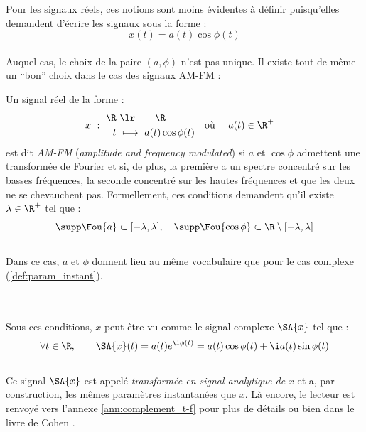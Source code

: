 Pour les signaux réels, ces notions sont moins évidentes à définir puisqu'elles demandent d'écrire les signaux sous la forme :
\[x(t) = a(t) \cos\phi(t)\]
\\
Auquel cas, le choix de la paire $(a,\phi)$ n'est pas unique. Il existe tout de même un ``bon'' choix dans le cas des signaux AM-FM :
\begin{definition}[Signal AM-FM]
	Un signal réel de la forme :
	\begin{align}
		x\ &:\ \begin{aligned}\R\ &\lr\qquad \R \\
			t\ &\longmapsto\ a(t) \cos\phi(t)
		\end{aligned}  &  \text{où }\quad a(t)\in\R^+\quad
	\end{align}
	est dit \emph{AM-FM} (\emph{amplitude and frequency modulated}) si $a$ et $\cos\phi$ admettent une transformée de Fourier et si, de plus, la première a un spectre concentré sur les basses fréquences, la seconde concentré sur les hautes fréquences et que les deux ne se chevauchent pas.
	Formellement, ces conditions demandent qu'il existe $\lambda\in\R^+$ tel que :
	\begin{equation}\label{eq:condi_AM-FM}
		\supp \Fou{a} \subset [-\lambda, \lambda],\quad \supp \Fou{\cos\phi} \subset \R\setminus[-\lambda,\lambda]
	\end{equation}
	\\
	Dans ce cas, $a$ et $\phi$ donnent lieu au même vocabulaire que pour le cas complexe (\cref{def:param_instant}).
\end{definition}
\skipl
\\
\\
Sous ces conditions, $x$ peut être vu comme le signal complexe $\SA{x}$ tel que :
\begin{equation}
	\forall t\in\R,\qquad \SA{x}(t) = a(t) e^{\i \phi(t)}= a(t)\cos\phi(t) + \i a(t)\sin\phi(t)
\end{equation}
\\
Ce signal $\SA{x}$ est appelé \emph{transformée en signal analytique de} $x$ et a, par construction, les mêmes paramètres instantanées que $x$.
Là encore, le lecteur est renvoyé vers l'annexe \ref{ann:complement_t-f} pour plus de détails ou bien dans le livre de Cohen \cite{cohen_time_1995}.
\\


